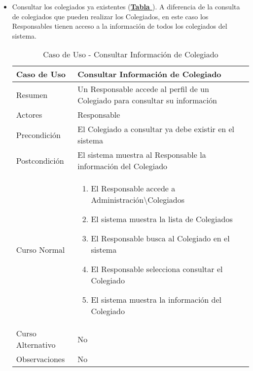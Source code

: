 \begin{itemize}
	\item \addtocounter{tabla}{1} Consultar los colegiados ya existentes (\textbf{\hyperref[tab:curConsultaInfoColeg]{Tabla }}). A diferencia de la consulta de colegiados que pueden realizar los Colegiados, en este caso los Responsables tienen acceso a la información de todos los colegiados del sistema.
		\begin{table}[!htbp]
		  \centering  \addtocounter{casouso}{1}
		  \begin{tabular}{|l | p{100mm}|}
		    \textbf{Caso de Uso}  & \textbf{Consultar Información de Colegiado} \\ \hline
		    Resumen 		 & Un Responsable accede al perfil de un Colegiado para consultar su información \\ \hline
		    Actores  		 & Responsable \\ \hline
		    Precondición  	 & El Colegiado a consultar ya debe existir en el sistema \\ \hline
		    Postcondición  	 & El sistema muestra al Responsable la información del Colegiado \\ \hline
		    Curso Normal   	 & \begin{enumerate}
			  \item El Responsable accede a Administración\textbackslash Colegiados
			  \item El sistema muestra la lista de Colegiados
			  \item El Responsable busca al Colegiado en el sistema
			  \item El Responsable selecciona consultar el Colegiado
			  \item El sistema muestra la información del Colegiado
		    \end{enumerate}  \\ \hline
		    Curso Alternativo  & No  \\ \hline
		    Observaciones 	 & No \\ \hline
		  \end{tabular}
		  \caption{Caso de Uso  - Consultar Información de Colegiado}
		  \label{tab:curConsultaInfoColeg}
		\end{table}
		\FloatBarrier \pagebreak


\end{itemize}
